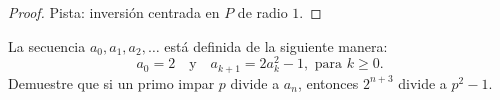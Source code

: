 \begin{proof}
	Pista: inversión centrada en $P$ de radio $1$.
\end{proof}

\begin{probMR}
	La secuencia $a_0,a_1,a_2,\dots$ está definida de la siguiente manera:
	\[a_0=2\quad\text{y}\quad a_{k+1}=2a_k^2-1,\text{ para }k\ge 0.\]
	Demuestre que si un primo impar $p$ divide a $a_n$, entonces $2^{n+3}$ divide a $p^2-1$.
\end{probMR}
